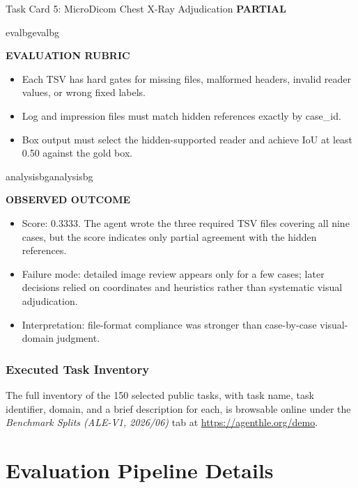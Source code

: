 \documentclass{llmxive}
\providecommand{\StatusBadge}[3]{\begingroup\setlength{\fboxsep}{3pt}\colorbox{#2}{\textbf{#1}}\endgroup}
\providecommand{\BlockTitle}[1]{{\raggedright\textbf{\footnotesize #1}\par}\vspace{2pt}}
\begin{document}
\begin{ColorTaskCard}{Task Card 5: MicroDicom Chest X-Ray Adjudication \hfill \StatusBadge{PARTIAL}{partialbg}{partialorange}}
\begin{minipage}[t]{0.49\linewidth}
\end{minipage}\hfill
\begin{minipage}[t]{0.49\linewidth}
\vspace{0pt}
\begin{CardBlock}{evalbg}{evalbg}
\BlockTitle{EVALUATION RUBRIC}
\begin{itemize}
\item Each TSV has hard gates for missing files, malformed headers, invalid reader values, or wrong fixed labels.
\item Log and impression files must match hidden references exactly by case\_id.
\item Box output must select the hidden-supported reader and achieve IoU at least 0.50 against the gold box.
\end{itemize}
\end{CardBlock}

\begin{CardBlock}{analysisbg}{analysisbg}
\BlockTitle{OBSERVED OUTCOME}
\begin{itemize}
\item Score: 0.3333. The agent wrote the three required TSV files covering all nine cases, but the score indicates only partial agreement with the hidden references.
\item Failure mode: detailed image review appears only for a few cases; later decisions relied on coordinates and heuristics rather than systematic visual adjudication.
\item Interpretation: file-format compliance was stronger than case-by-case visual-domain judgment.
\end{itemize}
\end{CardBlock}
\end{minipage}
\end{ColorTaskCard}

\endgroup

\subsubsection{Executed Task Inventory}
\label{app:complete-executed-task-inventory}

The full inventory of the 150 selected public tasks, with task name, task identifier, domain, and a brief description for each, is browsable online under the \emph{Benchmark Splits (ALE-V1, 2026/06)} tab at \url{https://agenthle.org/demo}. 



\section{Evaluation Pipeline Details}
\label{app:evaluation-pipeline}
\end{document}

